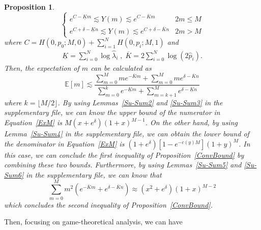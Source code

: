 \documentclass{article}
\makeatletter
\newtheorem{proposition}[theorem]{Proposition}
\renewenvironment{proof}[1][\proofname]{\par
  \vspace{-\topsep}%
  \pushQED{\qed}%
  \normalfont
  \topsep0pt \partopsep0pt %
  \trivlist
  \item[\hskip\labelsep
        \itshape
    #1\@addpunct{.}]\ignorespaces
}{%
  \popQED\endtrivlist\@endpefalse
  \addvspace{0pt plus 0pt} %
}
\makeatother
\begin{document}
\begin{proposition}
\begin{proof}
\begin{equation}
\left\{
\begin{array}{lc}
e^{C-\underline{K}m}\lesssim Y(m) \lesssim e^{C-\overline{K}m} & 2m\leq M\\
e^{C+\delta-\underline{K}n}\lesssim Y(m) \lesssim e^{C+\delta-\overline{K}n} & 2m>M
\end{array}
\right.
\end{equation}
where $C=H(0,p_0;M,0)+\sum_{i=1}^{N}H(0,p_i;M,1)$ and
\begin{equation*}
\begin{split}
\underline{K} = {\sum}_{i=0}^{N}\log \hat{\lambda}_{i}\;,\; \overline{K} =  2{\sum}_{i=0}^{N}\log \left(2\hat{p}_i\right).
\end{split}
\end{equation*}
Then, the expectation of $m$ can be calculated as
\begin{equation}
\label{ExM}
\mathbb{E}[m] \lesssim \frac{\sum_{m=0}^{M}me^{-\overline{K}m}+\sum_{m=0}^{M}me^{\delta-\overline{K}n}}{\sum_{m=0}^{k}e^{-\underline{K}m}+\sum_{m=k+1}^{M}e^{\delta-\underline{K}n}}
\end{equation}
where $k=\lfloor M/2 \rfloor$. By using Lemmas~\ref{Su-Sum2} and \ref{Su-Sum3} in the supplementary file, we can know the upper bound of the numerator in Equation~\ref{ExM} is $M(x+e^{\delta})(1+x)^{M-1}$. On the other hand, by using Lemma~\ref{Su-Sum4} in the supplementary file, we can obtain the lower bound of the denominator in Equation~\ref{ExM} is $(1+e^{\delta})[1-e^{-c(y)M}](1+y)^{M}$. In this case, we can conclude the first inequality of Proposition~\ref{ConvBound} by combining these two bounds. Furthermore, by using Lemmas~\ref{Su-Sum5} and \ref{Su-Sum6} in the supplementary file, we can know that
\begin{equation}
\sum_{m=0}^{M}m^2(e^{-\overline{K}m}+e^{\delta-\overline{K}n})\approx (x^2+e^{\delta})(1+x)^{M-2}
\end{equation}
which concludes the second inequality of Proposition~\ref{ConvBound}.
\end{proof}
\end{proposition}
Then, focusing on game-theoretical analysis, we can have
\end{document}
